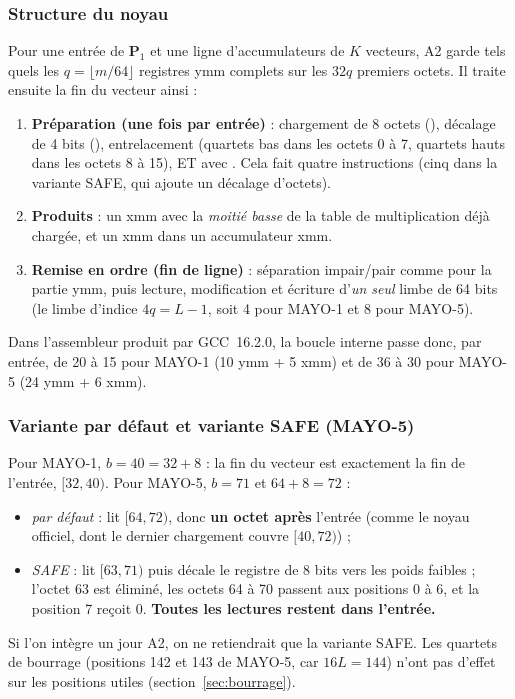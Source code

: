 \subsubsection{Structure du noyau}
Pour une entrée de $\mathbf{P}_1$ et une ligne d'accumulateurs de $K$ vecteurs, A2 garde tels quels les $q=\lfloor m/64\rfloor$ registres ymm complets sur les $32q$ premiers octets. Il traite ensuite la fin du vecteur ainsi :
\begin{enumerate}[nosep]
\item \textbf{Préparation (une fois par entrée)} : chargement de 8 octets (), décalage de 4 bits (), entrelacement  (quartets bas dans les octets 0 à 7, quartets hauts dans les octets 8 à 15), ET avec . Cela fait quatre instructions (cinq dans la variante SAFE, qui ajoute un décalage d'octets).
\item \textbf{Produits} : un  xmm avec la \emph{moitié basse} de la table de multiplication déjà chargée, et un  xmm dans un accumulateur xmm.
\item \textbf{Remise en ordre (fin de ligne)} : séparation impair/pair comme pour la partie ymm, puis lecture, modification et écriture d'\emph{un seul} limbe de 64 bits (le limbe d'indice $4q=L-1$, soit 4 pour MAYO-1 et 8 pour MAYO-5).
\end{enumerate}
Dans l'assembleur produit par GCC~16.2.0, la boucle interne passe donc, par entrée, de 20 à 15  pour MAYO-1 (10 ymm + 5 xmm) et de 36 à 30 pour MAYO-5 (24 ymm + 6 xmm).

\subsubsection{Variante par défaut et variante SAFE (MAYO-5)}
Pour MAYO-1, $b=40=32+8$ : la fin du vecteur est exactement la fin de l'entrée, $[32,40)$. Pour MAYO-5, $b=71$ et $64+8=72$ :
\begin{itemize}[nosep]
\item \emph{par défaut} : lit $[64,72)$, donc \textbf{un octet après} l'entrée (comme le noyau officiel, dont le dernier chargement couvre $[40,72)$) ;
\item \emph{SAFE} : lit $[63,71)$ puis décale le registre de 8 bits vers les poids faibles ; l'octet 63 est éliminé, les octets 64 à 70 passent aux positions 0 à 6, et la position 7 reçoit 0. \textbf{Toutes les lectures restent dans l'entrée.}
\end{itemize}
Si l'on intègre un jour A2, on ne retiendrait que la variante SAFE. Les quartets de bourrage (positions 142 et 143 de MAYO-5, car $16L=144$) n'ont pas d'effet sur les positions utiles (section~\ref{sec:bourrage}).

